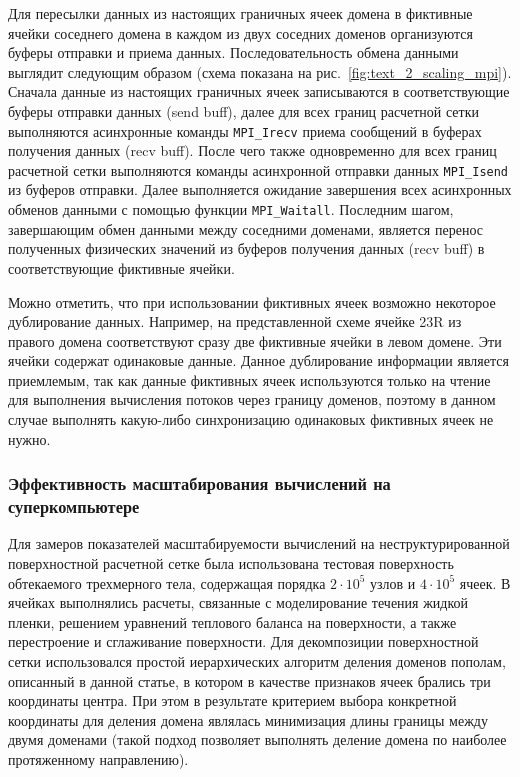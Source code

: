 Для пересылки данных из настоящих граничных ячеек домена в фиктивные ячейки соседнего домена в каждом из двух соседних доменов организуются буферы отправки и приема данных.
Последовательность обмена данными выглядит следующим образом (схема показана на рис.~\ref{fig:text_2_scaling_mpi}).
Сначала данные из настоящих граничных ячеек записываются в соответствующие буферы отправки данных (send buff), далее для всех границ расчетной сетки выполняются асинхронные команды \texttt{MPI\_Irecv} приема сообщений в буферах получения данных (recv buff).
После чего также одновременно для всех границ расчетной сетки выполняются команды асинхронной отправки данных \texttt{MPI\_Isend} из буферов отправки.
Далее выполняется ожидание завершения всех асинхронных обменов данными с помощью функции \texttt{MPI\_Waitall}.
Последним шагом, завершающим обмен данными между соседними доменами, является перенос полученных физических значений из буферов получения данных (recv buff) в соответствующие фиктивные ячейки.

Можно отметить, что при использовании фиктивных ячеек возможно некоторое дублирование данных.
Например, на представленной схеме ячейке 23R из правого домена соответствуют сразу две фиктивные ячейки в левом домене.
Эти ячейки содержат одинаковые данные.
Данное дублирование информации является приемлемым, так как данные фиктивных ячеек используются только на чтение для выполнения вычисления потоков через границу доменов, поэтому в данном случае выполнять какую-либо синхронизацию одинаковых фиктивных ячеек не нужно.

\subsubsection{Эффективность масштабирования вычислений на суперкомпьютере}

Для замеров показателей масштабируемости вычислений на неструктурированной поверхностной расчетной сетке была использована тестовая поверхность обтекаемого трехмерного тела, содержащая порядка $2 \cdot 10^5$ узлов и $4 \cdot 10^5$ ячеек.
В ячейках выполнялись расчеты, связанные с моделирование течения жидкой пленки, решением уравнений теплового баланса на поверхности, а также перестроение и сглаживание поверхности.
Для декомпозиции поверхностной сетки использовался простой иерархических алгоритм деления доменов пополам, описанный в данной статье, в котором в качестве признаков ячеек брались три координаты центра.
При этом в результате критерием выбора конкретной координаты для деления домена являлась минимизация длины границы между двумя доменами (такой подход позволяет выполнять деление домена по наиболее протяженному направлению).

